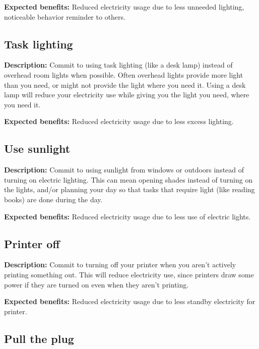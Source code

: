\vspace{2ex}
\textbf{Expected benefits:} Reduced electricity usage due to less unneeded lighting, noticeable behavior reminder to others.


\subsection{Task lighting}

\textbf{Description:} Commit to using task lighting (like a desk lamp) instead of overhead room lights when possible. Often overhead lights provide more light than you need, or might not provide the light where you need it. Using a desk lamp will reduce your electricity use while giving you the light you need, where you need it.

\vspace{2ex}
\textbf{Expected benefits:} Reduced electricity usage due to less excess lighting.


\subsection{Use sunlight}

\textbf{Description:} Commit to using sunlight from windows or outdoors instead of turning on electric lighting. This can mean opening shades instead of turning on the lights, and/or planning your day so that tasks that require light (like reading books) are done during the day.

\vspace{2ex}
\textbf{Expected benefits:} Reduced electricity usage due to less use of electric lights.


\subsection{Printer off}

\textbf{Description:} Commit to turning off your printer when you aren't actively printing something out. This will reduce electricity use, since printers draw some power if they are turned on even when they aren't printing.

\vspace{2ex}
\textbf{Expected benefits:} Reduced electricity usage due to less standby electricity for printer.


\subsection{Pull the plug}

